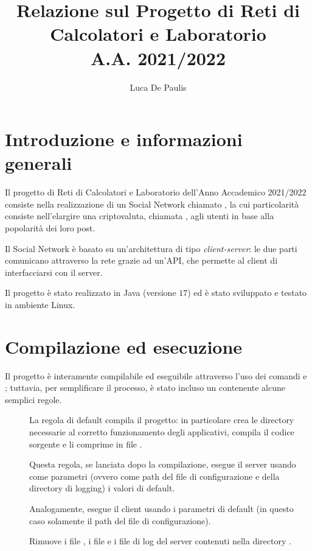 \documentclass[
    oneside,
    10pt,
    language=italian,
    a4paper,
    article
]{notes}
\author{Luca De Paulis}
\title{Relazione sul Progetto di Reti di Calcolatori e Laboratorio \\
    \large A.A. 2021/2022 }
\begin{document}
\maketitle

\section{Introduzione e informazioni generali}
Il progetto di Reti di Calcolatori e Laboratorio dell'Anno Accademico 2021/2022
consiste nella realizzazione di un Social Network chiamato ,
la cui particolarità consiste nell'elargire una criptovaluta, chiamata 
, agli utenti in base alla popolarità dei loro post.

Il Social Network è basato su un'architettura di tipo \emph{client-server}:
le due parti comunicano attraverso la rete grazie ad un'API, che permette
al client di interfacciarsi con il server.

Il progetto è stato realizzato in Java (versione $17$) ed è stato sviluppato e 
testato in ambiente Linux.

\section{Compilazione ed esecuzione}
Il progetto è interamente compilabile ed eseguibile attraverso l'uso dei comandi
 e ; tuttavia, per semplificare il processo, è stato
incluso un  contenente alcune semplici regole.
\begin{description}
    \item[] La regola di default compila il progetto: in particolare 
        crea le directory necessarie al corretto funzionamento degli applicativi,
        compila il codice sorgente e li comprime in file .
    \item[] Questa regola, se lanciata dopo la
        compilazione, esegue il server usando come parametri (ovvero come 
        path del file di configurazione e della directory di logging)
        i valori di default.
    \item[] Analogamente, esegue il client usando
        i parametri di default (in questo caso solamente il path del
        file di configurazione).  
    \item[] Rimuove i file , i file 
        e i file di log del server contenuti nella directory . 
\end{description}
\end{document}
